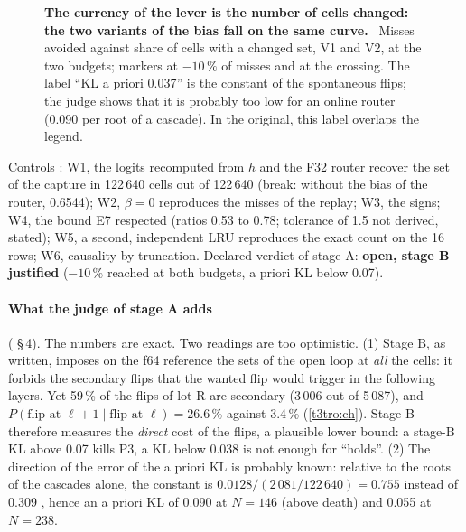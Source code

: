 \begin{figure}[tbp]
\centering
{}
\caption[P3, stage A: misses avoided against cells changed]{\textbf{The currency of the lever is the number of cells changed: the two variants of the bias fall on the same curve.} \mes~Misses avoided against share of cells with a changed set, V1 and V2, at the two budgets; markers at $-10\,\%$ of misses and at the crossing. The label ``KL a priori 0.037'' is the constant of the spontaneous flips; the judge shows that it is probably too low for an online router (0.090 per root of a cascade). In the original, this label overlaps the legend. \HorsStyle{}}
\label{fig:t3-mim-p3-pareto}
\end{figure}

Controls \mes: W1, the logits recomputed from $h$ and the F32 router recover the set of the capture in 122\,640 cells out of 122\,640 (break: without the bias of the router, 0.6544); W2, $\beta = 0$ reproduces the misses of the replay; W3, the signs; W4, the bound E7 respected (ratios 0.53 to 0.78; tolerance of 1.5 not derived, stated); W5, a second, independent LRU reproduces the exact count on the 16 rows; W6, causality by truncation. Declared verdict of stage A: \textbf{open, stage B justified} ($-10\,\%$ reached at both budgets, a priori KL below 0.07).

\paragraph{What the judge of stage A adds} ( §\,4). The numbers are exact. Two readings are too optimistic. (1) Stage B, as written, imposes on the f64 reference the sets of the open loop at \emph{all} the cells: it forbids the secondary flips that the wanted flip would trigger in the following layers. Yet 59\,\% of the flips of lot R are secondary (3\,006 out of 5\,087), and $P(\text{flip at } \ell+1 \mid \text{flip at } \ell) = 26.6\,\%$ against 3.4\,\% (\cref{t3tro:ch}). Stage B therefore measures the \emph{direct} cost of the flips, a plausible lower bound: a stage-B KL above 0.07 kills P3, a KL below 0.038 is not enough for ``holds''. (2) The direction of the error of the a priori KL is probably known: relative to the roots of the cascades alone, the constant is $0.0128/(2\,081/122\,640) = 0.755$ instead of 0.309 \calc, hence an a priori KL of 0.090 at $N = 146$ (above death) and 0.055 at $N = 238$.


